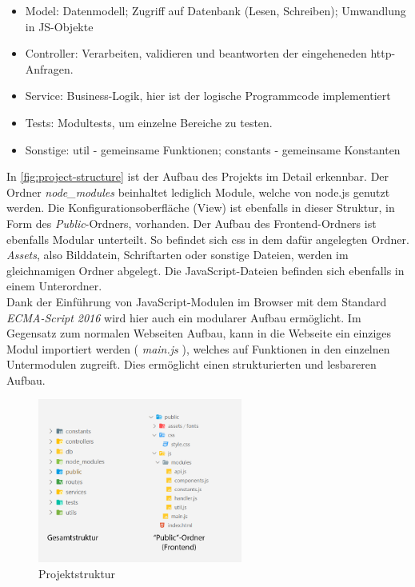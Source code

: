 \begin{itemize}
    \item Model: Datenmodell; Zugriff auf Datenbank (Lesen, Schreiben); Umwandlung in JS-Objekte
    \item Controller: Verarbeiten, validieren und beantworten der eingeheneden \gls{http}-Anfragen.
    \item  Service: Business-Logik, hier ist der logische Programmcode implementiert
    \item Tests: Modultests, um einzelne Bereiche zu testen. 
    \item Sonstige: util - gemeinsame Funktionen; constants - gemeinsame Konstanten
\end{itemize}

In \autoref{fig:project-structure} ist der Aufbau des Projekts im Detail erkennbar. Der Ordner \textit{node{\_}modules} beinhaltet lediglich Module, welche von node.js genutzt werden. 
Die Konfigurationsoberfläche (View) ist ebenfalls in dieser Struktur, in Form des \textit{Public}-Ordners, vorhanden. Der Aufbau des Frontend-Ordners ist ebenfalls Modular unterteilt. So befindet sich \gls{css} in dem dafür angelegten Ordner. \textit{Assets}, also Bilddatein, Schriftarten oder sonstige Dateien, werden im gleichnamigen Ordner abgelegt. Die JavaScript-Dateien befinden sich ebenfalls in einem Unterordner. \\
Dank der Einführung von JavaScript-Modulen im Browser mit dem Standard \textit{ECMA-Script 2016} wird hier auch ein modularer Aufbau ermöglicht. Im Gegensatz zum normalen Webseiten Aufbau, kann in die Webseite ein einziges Modul importiert werden ( \textit{main.js} ), welches auf Funktionen in den einzelnen Untermodulen zugreift. Dies ermöglicht einen strukturierten und lesbareren Aufbau. \cite{Mozilla.2020}

\begin{figure}[h]
    \centering
    \includegraphics[width=0.6\textwidth]{figures/ordner-strukturen.png}
    \caption{Projektstruktur}
    \label{fig:project-structure}
\end{figure}
